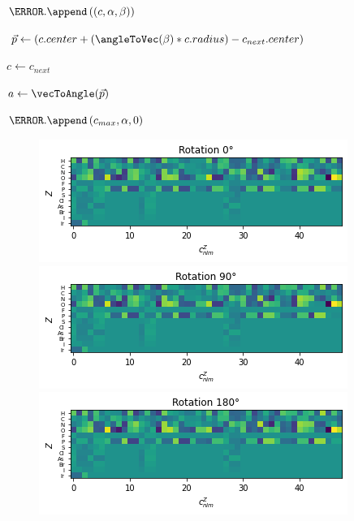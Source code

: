 \begin{algorithm}[h]
{    $\C.\append \left(
        \left(c , \alpha , \beta \right)
      \right)
    $
  
    $ \vec{p} \leftarrow \left( c.center + (\angleToVec(\beta) * c.radius ) - c_{next}.center\right)$
    
    $ c \leftarrow c_{next} $
    
    $  a \leftarrow \vecToAngle(\vec{p}) $
  
    }
  
    $\C.\append \left( c_{max}, \alpha, 0 \right)$
  
\end{algorithm}
  
  

\begin{figure}
  \begin{multicols}{2}
      \includegraphics[width=\linewidth]{figures/regression/snap/rot0.png}\par 
      \includegraphics[width=\linewidth]{figures/regression/snap/rot90.png}\par 
  \end{multicols}
  \begin{multicols}{2}
      \includegraphics[width=\linewidth]{figures/regression/snap/rot180.png}\par

\end{multicols}
\end{figure}
